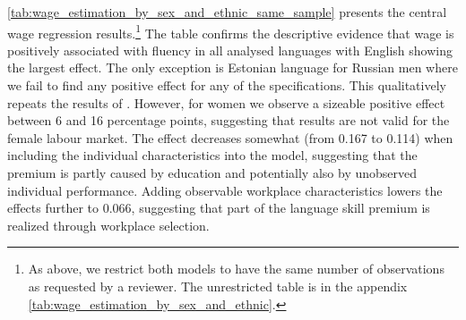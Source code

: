 \documentclass[12pt, a4paper]{article}
\begin{document}
\cref{tab:wage_estimation_by_sex_and_ethnic_same_sample} presents the
central wage regression
results.\footnote{As above, we
restrict both models to have the same number of observations as
requested by a reviewer. The unrestricted table is in the appendix \cref{tab:wage_estimation_by_sex_and_ethnic}.}
The table
confirms the descriptive evidence that wage is positively associated
with fluency in all analysed languages with English showing the
largest effect. The only exception is
Estonian language for Russian men where we fail to find any positive
effect for any of the specifications. This qualitatively repeats the results of
\citet{Toomet2011}. However, for women we observe a sizeable
positive effect between 6 and 16 percentage points, suggesting that
\citet{Toomet2011} results are not valid for the female labour market. The effect decreases somewhat
(from 0.167 to 0.114) when including the individual characteristics
into the model, suggesting that the premium
is partly caused by education and potentially also by unobserved
individual performance. Adding observable workplace characteristics
lowers the effects further to 0.066, suggesting that part of the
language skill premium is realized through workplace selection.
\end{document}
